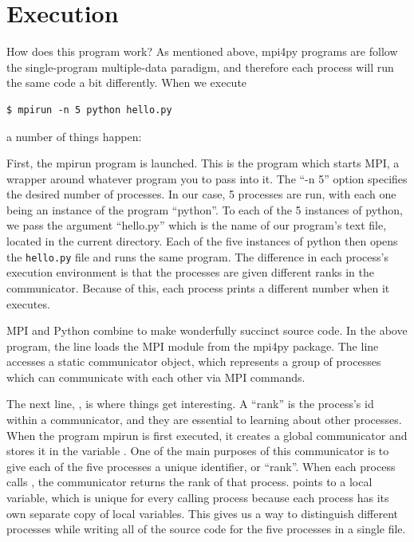 \section*{Execution}
How does this program work? As mentioned above, mpi4py programs are follow the single-program 
multiple-data paradigm, and therefore each process will run the same code a bit differently. 
When we execute 
\begin{lstlisting}[style=ShellInput]
$ mpirun -n 5 python hello.py
\end{lstlisting}
a number of things happen:

First, the mpirun program is launched. 
This is the program which starts MPI, a wrapper around whatever program you to pass into it. 
The ``-n 5'' option specifies the desired number of processes. 
In our case, 5 processes are run, with each one being an instance of the program ``python''. 
To each of the 5 instances of python, we pass the argument ``hello.py'' which is the name of our program's text file, 
located in the current directory. Each of the five instances of python then opens the 
\texttt{hello.py} file and runs the same program. 
The difference in each process's execution environment is that the processes are given 
different ranks in the communicator. Because of this, each process prints a different 
number when it executes.

MPI and Python combine to make wonderfully succinct source code. 
In the above program, the line  loads the MPI module from the mpi4py package.
The line  accesses a static communicator object, which represents a group of processes which can communicate with each other via MPI commands.

The next line, , is where things get interesting. 
A ``rank'' is the process's id within a communicator, and they are essential to learning 
about other processes. When the program mpirun is first executed, it creates a 
global communicator and stores it in the variable . 
One of the main purposes of this communicator is to give each of the five processes a 
unique identifier, or ``rank''. When each process calls , 
the communicator returns the rank of that process. 
 points to a local variable, which is unique for every calling process 
because each process has its own separate copy of local variables. 
This gives us a way to distinguish different processes while writing all of the source code 
for the five processes in a single file.

